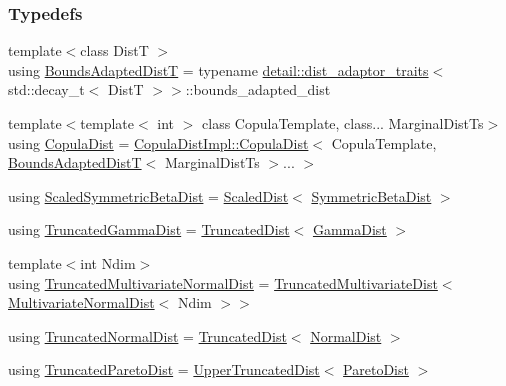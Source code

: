 \subsubsection*{Typedefs}
\begin{DoxyCompactItemize}
\item 
{\footnotesize template$<$class DistT $>$ }\\using \hyperlink{namespaceprior__hessian_a919f0d7f51ea845224ca7f03983508a9}{Bounds\+Adapted\+DistT} = typename \hyperlink{classprior__hessian_1_1detail_1_1dist__adaptor__traits}{detail\+::dist\+\_\+adaptor\+\_\+traits}$<$ std\+::decay\+\_\+t$<$ DistT $>$$>$\+::bounds\+\_\+adapted\+\_\+dist
\item 
{\footnotesize template$<$template$<$ int $>$ class Copula\+Template, class... Marginal\+Dist\+Ts$>$ }\\using \hyperlink{namespaceprior__hessian_a40a0589f5be3c61e4c4854fcefe8855f}{Copula\+Dist} = \hyperlink{classprior__hessian_1_1CopulaDistImpl_1_1CopulaDist}{Copula\+Dist\+Impl\+::\+Copula\+Dist}$<$ Copula\+Template, \hyperlink{namespaceprior__hessian_a919f0d7f51ea845224ca7f03983508a9}{Bounds\+Adapted\+DistT}$<$ Marginal\+Dist\+Ts $>$... $>$
\item 
using \hyperlink{namespaceprior__hessian_ae84776b8f8ed86c14a5ce47a29b7a1be}{Scaled\+Symmetric\+Beta\+Dist} = \hyperlink{classprior__hessian_1_1ScaledDist}{Scaled\+Dist}$<$ \hyperlink{classprior__hessian_1_1SymmetricBetaDist}{Symmetric\+Beta\+Dist} $>$
\item 
using \hyperlink{namespaceprior__hessian_acd158ecf6698fbe5a4430df7730d3aba}{Truncated\+Gamma\+Dist} = \hyperlink{classprior__hessian_1_1TruncatedDist}{Truncated\+Dist}$<$ \hyperlink{classprior__hessian_1_1GammaDist}{Gamma\+Dist} $>$
\item 
{\footnotesize template$<$int Ndim$>$ }\\using \hyperlink{namespaceprior__hessian_a99ef03c8a3e476931d451d6d944ffae5}{Truncated\+Multivariate\+Normal\+Dist} = \hyperlink{classprior__hessian_1_1TruncatedMultivariateDist}{Truncated\+Multivariate\+Dist}$<$ \hyperlink{classprior__hessian_1_1MultivariateNormalDist}{Multivariate\+Normal\+Dist}$<$ Ndim $>$$>$
\item 
using \hyperlink{namespaceprior__hessian_a47f38d4bb5d31fd3f01f5eb6ba6f1223}{Truncated\+Normal\+Dist} = \hyperlink{classprior__hessian_1_1TruncatedDist}{Truncated\+Dist}$<$ \hyperlink{classprior__hessian_1_1NormalDist}{Normal\+Dist} $>$
\item 
using \hyperlink{namespaceprior__hessian_afebdccc7e1a35836f660f8a301af9cb2}{Truncated\+Pareto\+Dist} = \hyperlink{classprior__hessian_1_1UpperTruncatedDist}{Upper\+Truncated\+Dist}$<$ \hyperlink{classprior__hessian_1_1ParetoDist}{Pareto\+Dist} $>$

\end{DoxyCompactItemize}
